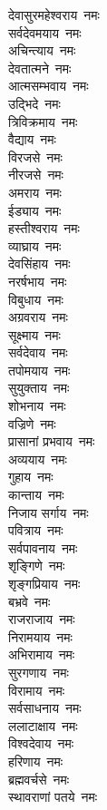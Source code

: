 \begin{multicols}{2}
\begin{flushleft}
देवासुरमहेश्वराय~नमः\\
सर्वदेवमयाय~नमः\hfill{}\\
अचिन्त्याय~नमः\\
देवतात्मने~नमः\\
आत्मसम्भवाय~नमः\\
उद्भिदे~नमः\\
त्रिविक्रमाय~नमः\\
वैद्याय~नमः\\
विरजसे~नमः\\
नीरजसे~नमः\\
अमराय~नमः\\
ईड्याय~नमः\hfill{}\\
हस्तीश्वराय~नमः\\
व्याघ्राय~नमः\\
देवसिंहाय~नमः\\
नरर्षभाय~नमः\\
विबुधाय~नमः\\
अग्रवराय~नमः\\
सूक्ष्माय~नमः\\
सर्वदेवाय~नमः\\
तपोमयाय~नमः\\
सुयुक्ताय~नमः\hfill{}\\
शोभनाय~नमः\\
वज्रिणे~नमः\\
प्रासानां प्रभवाय~नमः\\
अव्ययाय~नमः\\
गुहाय~नमः\\
कान्ताय~नमः\\
निजाय सर्गाय~नमः\\
पवित्राय~नमः\\
सर्वपावनाय~नमः\\
शृङ्गिणे~नमः\hfill{}\\
शृङ्गप्रियाय~नमः\\
बभ्रवे~नमः\\
राजराजाय~नमः\\
निरामयाय~नमः\\
अभिरामाय~नमः\\
सुरगणाय~नमः\\
विरामाय~नमः\\
सर्वसाधनाय~नमः\\
ललाटाक्षाय~नमः\\
विश्वदेवाय~नमः\hfill{}\\
हरिणाय~नमः\\
ब्रह्मवर्चसे~नमः\\
स्थावराणां पतये~नमः\\

\end{flushleft}
\end{multicols}
